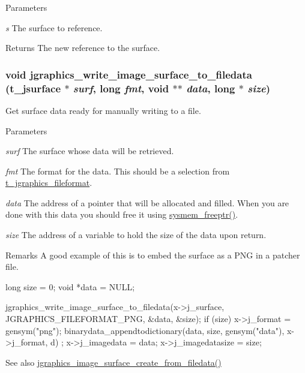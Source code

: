 \begin{DoxyParams}{Parameters}
\item[{\em s}]The surface to reference. \end{DoxyParams}
\begin{DoxyReturn}{Returns}
The new reference to the surface. 
\end{DoxyReturn}
\hypertarget{group__jsurface_ga96f2b8270e4fba3f2438ff829dc0279b}{
\subsubsection[{jgraphics\_\-write\_\-image\_\-surface\_\-to\_\-filedata}]{\setlength{\rightskip}{0pt plus 5cm}void jgraphics\_\-write\_\-image\_\-surface\_\-to\_\-filedata ({\bf t\_\-jsurface} $\ast$ {\em surf}, \/  long {\em fmt}, \/  void $\ast$$\ast$ {\em data}, \/  long $\ast$ {\em size})}}
\label{group__jsurface_ga96f2b8270e4fba3f2438ff829dc0279b}


Get surface data ready for manually writing to a file. 
\begin{DoxyParams}{Parameters}
\item[{\em surf}]The surface whose data will be retrieved. \item[{\em fmt}]The format for the data. This should be a selection from \hyperlink{group__jgraphics_ga81465e1a6989399e343d081defd90dbe}{t\_\-jgraphics\_\-fileformat}. \item[{\em data}]The address of a pointer that will be allocated and filled. When you are done with this data you should free it using \hyperlink{group__memory_ga200c82639e547869db1f3887d17102d3}{sysmem\_\-freeptr()}. \item[{\em size}]The address of a variable to hold the size of the data upon return.\end{DoxyParams}
\begin{DoxyRemark}{Remarks}
A good example of this is to embed the surface as a PNG in a patcher file. 
\begin{DoxyCode}
    long size = 0;
    void *data = NULL;
    
    jgraphics_write_image_surface_to_filedata(x->j_surface, 
      JGRAPHICS_FILEFORMAT_PNG, &data, &size);
    if (size) {
        x->j_format = gensym("png");
        binarydata_appendtodictionary(data, size, gensym("data"), x->j_format, d)
      ;
        x->j_imagedata = data;
        x->j_imagedatasize = size;
    }
\end{DoxyCode}
 
\end{DoxyRemark}
\begin{DoxySeeAlso}{See also}
\hyperlink{group__jsurface_ga47be6691ef1b94e86e7783e7ce38ebe9}{jgraphics\_\-image\_\-surface\_\-create\_\-from\_\-filedata()} 
\end{DoxySeeAlso}
